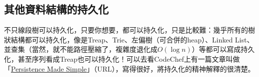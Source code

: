 		\subsection{其他資料結構的持久化}
			不只線段樹可以持久化，只要你想要，都可以持久化，只是比較難：幾乎所有的樹狀結構都可以持久化，像是Treap、Trie、左偏樹（可合併的heap）、Linked List、並查集（當然，就不能路徑壓縮了，複雜度退化成$O(\log n)$）等都可以寫成持久化，甚至序列看成Treap也可以持久化！可以去看CodeChef上有一篇文章叫做「\href{https://discuss.codechef.com/t/persistence-made-simple-tutorial/14915}{\underline{Persistence Made Simple}}」（URL），寫得很好，將持久化的精神解釋的很清楚。